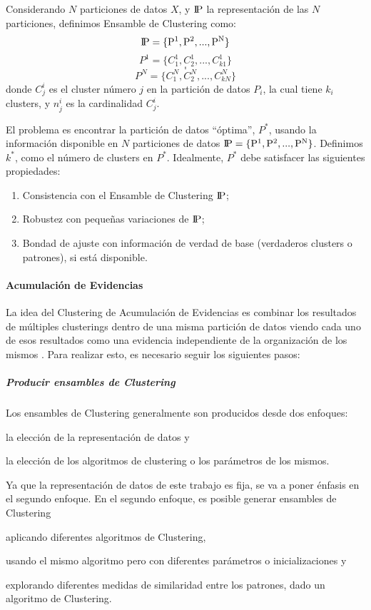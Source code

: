 \bigskip Considerando \(N\) particiones de datos \(X\), y \(\rm I\!P\) la representación de las \(N\) particiones, definimos Ensamble de Clustering como:
\[\rm I\!P = \{P^1, P^2, ..., P^N\}\]
\[P^1 = \{C^1_1, C^1_2, ..., C^1_{k1}\}\]
\[.\]
\[.\]
\[P^N = \{C^N_1, C^N_2, ..., C^N_{kN}\}\]
donde \(C^i_j\) es el cluster número \(j\) en la partición de datos \(P_i\), la cual tiene \(k_i\) clusters, y \(n^i_j\) es la cardinalidad  \(C^i_j\).

\bigskip El problema es encontrar la partición de datos “óptima”, \(P^*\), usando la información disponible en \(N\) particiones de datos \(\rm I\!P = \{P^1, P^2, ..., P^N\}\). Definimos \(k^*\), como el número de clusters en \(P^*\). Idealmente, \(P^*\) debe satisfacer las siguientes propiedades:

\begin{enumerate}
	\item Consistencia con el Ensamble de Clustering \(\rm I\!P\);
	\item Robustez con pequeñas variaciones de \(\rm I\!P\);
	\item Bondad de ajuste con información de verdad de base (verdaderos clusters o patrones), si está disponible.
\end{enumerate}

\paragraph{Acumulación de Evidencias}
La idea del Clustering de Acumulación de Evidencias es combinar los resultados de múltiples clusterings dentro de una misma partición de datos viendo cada uno de esos resultados como una evidencia independiente de la organización de los mismos \citep{fred2005combining}. Para realizar esto, es necesario seguir los siguientes pasos:

\subparagraph{Producir ensambles de Clustering}
Los ensambles de Clustering generalmente son producidos desde dos enfoques:
\begin{enumerate*}
	\item la elección de la representación de datos y
	\item la elección de los algoritmos de clustering o los parámetros de los mismos.
\end{enumerate*}
Ya que la representación de datos de este trabajo es fija, se va a poner énfasis en el segundo enfoque. En el segundo enfoque, es posible generar ensambles de Clustering \begin{enumerate*} [label=(\roman*)] \item aplicando diferentes algoritmos de Clustering, \item usando el mismo algoritmo pero con diferentes parámetros o inicializaciones y \item explorando diferentes medidas de similaridad entre los patrones, dado un algoritmo de Clustering.\end{enumerate*}


